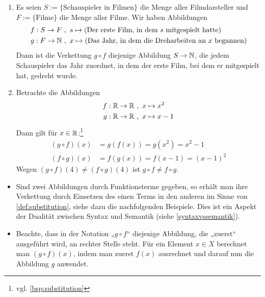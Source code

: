 \begin{bsp} \label{bsp:verkettung} \quad
    \begin{enumerate}
        \item Es seien $S:= \{ \text{Schauspieler in Filmen}\}$ die Menge aller Filmdarsteller und $F:=\{\text{Filme}\}$ die Menge aller Filme. Wir haben Abbildungen
        \begin{align*}
            f : S \to F \ & ,\ s\mapsto (\text{Der erste Film, in dem $s$ mitgespielt hatte}) \\
            g : F \to \mathbb N \ & ,\ x \mapsto (\text{Das Jahr, in dem die Dreharbeiten an $x$ begannen})
        \end{align*}
        Dann ist die Verkettung $g\circ f$ diejenige Abbildung $S\to \mathbb N$, die jedem Schauspieler das Jahr zuordnet, in dem der erste Film, bei dem er mitgespielt hat, gedreht wurde.
        \item Betrachte die Abbildungen
        \begin{align*}
            f : \mathbb R \to \mathbb R \ &,\ x\mapsto x^2 \\
            g : \mathbb R \to \mathbb R \ &,\ x \mapsto x-1
        \end{align*}
        Dann gilt für $x\in \mathbb R$:\footnote{vgl. \cref{bsp:substitution}}
        \begin{align*}
            (g\circ f)(x) & = g(f(x)) = g(x^2) = x^2-1 \\
            (f\circ g)(x) & = f(g(x)) = f(x-1) = (x-1)^2
        \end{align*}
        Wegen $(g\circ f)(4)\neq (f\circ g)(4)$ ist $g\circ f\neq f\circ g$.
    \end{enumerate}
\end{bsp}


\begin{bem} \quad
    \begin{itemize}
        \item Sind zwei Abbildungen durch Funktionsterme gegeben, so erhält man ihre Verkettung durch Einsetzen des einen Terms in den anderen im Sinne von \cref{def:substitution}, siehe dazu die nachfolgenden Beispiele. Dies ist ein Aspekt der Dualität zwischen Syntax und Semantik (siehe \cref{syntaxvssemantik}).
        \item Beachte, dass in der Notation „$g\circ f$“ diejenige Abbildung, die „zuerst“ ausgeführt wird, an rechter Stelle steht. Für ein Element $x \in X$ berechnet man $(g\circ f)(x)$, indem man zuerst $f(x)$ ausrechnet und darauf nun die Abbildung $g$ anwendet.
    \end{itemize}
\end{bem}


